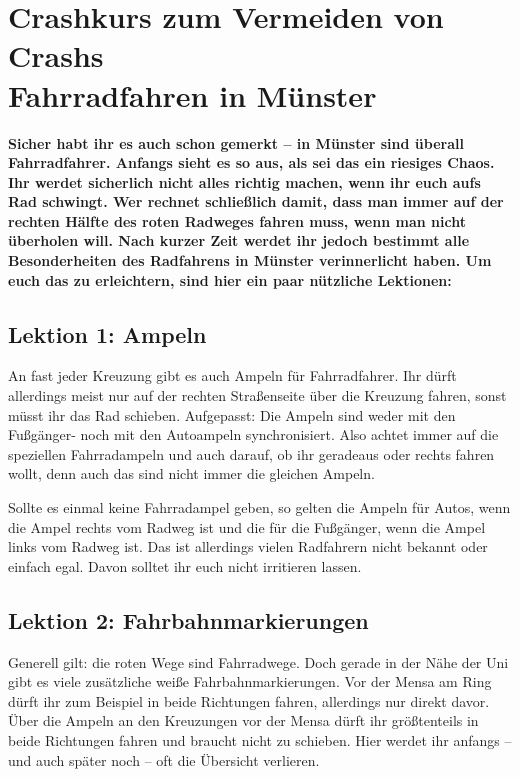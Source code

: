 \section[Fahrradfahren in Münster]{Crashkurs zum Vermeiden von Crashs\\Fahrradfahren in Münster}
\begin{multicols}{2}
\textbf{Sicher habt ihr es auch schon gemerkt -- in Münster sind überall Fahrradfahrer.
Anfangs sieht es so aus, als sei das ein riesiges Chaos.
Ihr werdet sicherlich nicht alles richtig machen, wenn ihr euch aufs Rad schwingt.
Wer rechnet schließlich damit, dass man immer auf der rechten Hälfte des roten Radweges fahren muss, wenn man nicht überholen will.
Nach kurzer Zeit werdet ihr jedoch bestimmt alle Besonderheiten des Radfahrens in Münster verinnerlicht haben.
Um euch das zu erleichtern, sind hier ein paar nützliche Lektionen:} 

\subsection{Lektion 1: Ampeln}
An fast jeder Kreuzung gibt es auch Ampeln für Fahrradfahrer.
Ihr dürft allerdings meist nur auf der rechten Straßenseite über die Kreuzung fahren, sonst müsst ihr das Rad schieben.
Aufgepasst: Die Ampeln sind weder mit den Fußgänger- noch mit den Autoampeln synchronisiert.
Also achtet immer auf die speziellen Fahrradampeln und auch darauf, ob ihr geradeaus oder rechts fahren wollt, denn auch das sind nicht immer die gleichen Ampeln.

Sollte es einmal keine Fahrradampel geben, so gelten die Ampeln für Autos, wenn die Ampel rechts vom Radweg ist und die für die Fußgänger, wenn die Ampel links vom Radweg ist.
Das ist allerdings vielen Radfahrern nicht bekannt oder einfach egal.
Davon solltet ihr euch nicht irritieren lassen.

\subsection{Lektion 2: Fahrbahnmarkierungen}
Generell gilt: die roten Wege sind Fahrradwege.
Doch gerade in der Nähe der Uni gibt es viele zusätzliche weiße Fahrbahnmarkierungen.
Vor der Mensa am Ring dürft ihr zum Beispiel in beide Richtungen fahren, allerdings nur direkt davor.
Über die Ampeln an den Kreuzungen vor der Mensa dürft ihr größtenteils in beide Richtungen fahren und braucht nicht zu schieben.
Hier werdet ihr anfangs -- und auch später noch -- oft die Übersicht verlieren.


\end{multicols}
